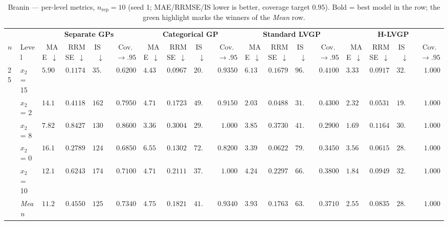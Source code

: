 \begin{table}[htbp]
\centering
\scriptsize
\setlength{\tabcolsep}{2.5pt}
\setlength{\fboxsep}{1pt}
\caption{Branin --- per-level metrics, $n_{\mathrm{rep}}=10$ (seed 1; MAE/RRMSE/IS lower is better, coverage target $0.95$). Bold = best model in the row; the green highlight marks the winners of the \emph{Mean} row.}
\label{tab:branin_hetero_nrep10}
\begin{tabular}{llrrrrrrrrrrrrrrrr}
\toprule
 & & \multicolumn{4}{c}{\textbf{Separate GPs}} & \multicolumn{4}{c}{\textbf{Categorical GP}} & \multicolumn{4}{c}{\textbf{Standard LVGP}} & \multicolumn{4}{c}{\textbf{H-LVGP}} \\
\cmidrule(lr){3-6} \cmidrule(lr){7-10} \cmidrule(lr){11-14} \cmidrule(lr){15-18}
$n$ & Level & MAE~$\downarrow$ & RRMSE~$\downarrow$ & IS~$\downarrow$ & Cov.~$\to.95$ & MAE~$\downarrow$ & RRMSE~$\downarrow$ & IS~$\downarrow$ & Cov.~$\to.95$ & MAE~$\downarrow$ & RRMSE~$\downarrow$ & IS~$\downarrow$ & Cov.~$\to.95$ & MAE~$\downarrow$ & RRMSE~$\downarrow$ & IS~$\downarrow$ & Cov.~$\to.95$ \\
\midrule
\multirow{6}{*}{25} & $x_2$ = 15 & $5.902$ & $0.1174$ & $35.77$ & $0.6200$ & $4.435$ & $0.0967$ & {\boldmath$20.37$} & {\boldmath$0.9350$} & $6.136$ & $0.1679$ & $96.80$ & $0.4100$ & {\boldmath$3.339$} & {\boldmath$0.0917$} & $32.68$ & $1.000$ \\
 & $x_2$ = 2 & $14.17$ & $0.4118$ & $162.3$ & $0.7950$ & $4.714$ & $0.1723$ & $49.29$ & {\boldmath$0.9150$} & {\boldmath$2.032$} & {\boldmath$0.0488$} & $31.46$ & $0.4300$ & $2.327$ & $0.0531$ & {\boldmath$19.96$} & $1.000$ \\
 & $x_2$ = 8 & $7.824$ & $0.8427$ & $130.3$ & $0.8600$ & $3.366$ & $0.3004$ & {\boldmath$29.88$} & {\boldmath$1.000$} & $3.853$ & $0.3730$ & $41.36$ & $0.2900$ & {\boldmath$1.691$} & {\boldmath$0.1164$} & $30.41$ & $1.000$ \\
 & $x_2$ = 0 & $16.19$ & $0.2789$ & $124.3$ & $0.6850$ & $6.556$ & $0.1302$ & $72.62$ & $0.8200$ & {\boldmath$3.392$} & $0.0622$ & $79.81$ & $0.3450$ & $3.565$ & {\boldmath$0.0615$} & {\boldmath$28.74$} & {\boldmath$1.000$} \\
 & $x_2$ = 10 & $12.14$ & $0.6243$ & $174.6$ & $0.7100$ & $4.714$ & $0.2111$ & $37.07$ & {\boldmath$1.000$} & $4.247$ & $0.2297$ & $66.10$ & $0.3800$ & {\boldmath$1.847$} & {\boldmath$0.0949$} & {\boldmath$32.76$} & $1.000$ \\
 & \textit{Mean} & $11.24$ & $0.4550$ & $125.4$ & $0.7340$ & $4.757$ & $0.1821$ & $41.85$ & \colorbox{green!20}{\boldmath$0.9340$} & $3.932$ & $0.1763$ & $63.11$ & $0.3710$ & \colorbox{green!20}{\boldmath$2.554$} & \colorbox{green!20}{\boldmath$0.0835$} & \colorbox{green!20}{\boldmath$28.91$} & $1.000$ \\

\end{tabular}
\end{table}
